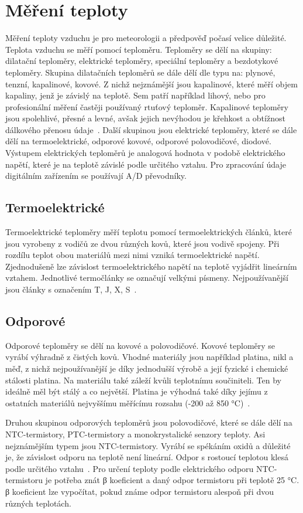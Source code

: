\chapter{Měření teploty}

    Měření teploty vzduchu je pro meteorologii a předpověď počasí velice důležité. Teplota vzduchu se měří pomocí teploměru. Teploměry se dělí na skupiny: dilatační teploměry, elektrické teploměry, speciální teploměry a bezdotykové teploměry. Skupina dilatačních teploměrů se dále dělí dle typu na: plynové, tenzní, kapalinové, kovové. Z nichž nejznámější jsou kapalinové, které měří objem kapaliny, jenž je závislý na teplotě. Sem patří například lihový, nebo pro profesionální měření častěji používaný rtuťový teploměr. Kapalinové teploměry jsou spolehlivé, přesné a levné, avšak jejich nevýhodou je křehkost a obtížnost dálkového přenosu údaje~\cite{Mereniteploty}. Další skupinou jsou elektrické teploměry, které se dále dělí na termoelektrické, odporové kovové, odporové polovodičové, diodové. Výstupem elektrických teploměrů je analogová hodnota v podobě elektrického napětí, které je na teplotě závislé podle určitého vztahu. Pro zpracování údaje digitálním zařízením se používají A/D převodníky.
    
    \section{Termoelektrické}
        Termoelektrické teploměry měří teplotu pomocí termoelektrických článků, které jsou vyrobeny z vodičů ze dvou různých kovů, které jsou vodivě spojeny. Při rozdílu teplot obou materiálů mezi nimi vzniká termoelektrické napětí. Zjednodušeně lze závislost termoelektrického napětí na teplotě vyjádřit lineárním vztahem. Jednotlivé termočlánky se označují velkými písmeny. Nejpoužívanější jsou články s označením T, J, X, S~\cite{Mereniteploty}.
        
    \section{Odporové}
        Odporové teploměry se dělí na kovové a polovodičové. Kovové teploměry se vyrábí výhradně z čistých kovů. Vhodné materiály jsou například platina, nikl a měď, z nichž nejpoužívanější je díky jednodušší výrobě a její fyzické i chemické stálosti platina. Na materiálu také záleží kvůli teplotnímu součiniteli. Ten by ideálně měl být stálý a co největší. Platina je výhodná také díky jejímu z ostatních materiálů nejvyššímu měřícímu rozsahu (-200 až 850 °C)~\cite{Mereniteploty}.
        
        Druhou skupinou odporových teploměrů jsou polovodičové, které se dále dělí na NTC-termistory, PTC-termistory a monokrystalické senzory teploty. Asi nejznámějším typem jsou NTC-termistory. Vyrábí se spékáním oxidů a důležité je, že závislost odporu na teplotě není lineární. Odpor s rostoucí teplotou klesá podle určitého vztahu~\cite{Mereniteploty}. Pro určení teploty podle elektrického odporu NTC-termistoru je potřeba znát β koeficient a daný odpor termistoru při teplotě 25 °C. β koeficient lze vypočítat, pokud známe odpor termistoru alespoň při dvou různých teplotách.
